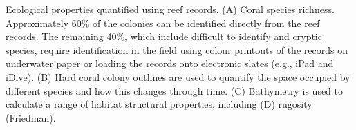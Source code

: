 \label{fig:EcologicalProperties}Ecological properties quantified using reef records. (A) Coral species richness. Approximately 60\% of the colonies can be identified directly from the reef records. The remaining 40\%, which include difficult to identify and cryptic species, require identification in the field using colour printouts of the records on underwater paper or loading the records onto electronic slates (e.g., iPad and iDive). (B) Hard coral colony outlines are used to quantify the space occupied by different species and how this changes through time. (C) Bathymetry is used to calculate a range of habitat structural properties, including (D) rugosity (Friedman).  